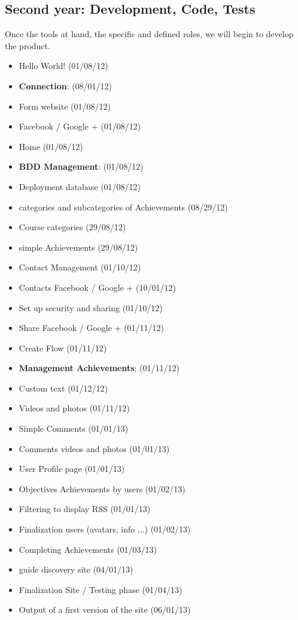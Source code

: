 \documentclass {life-en}
\begin{document}
\subsection{Second year: Development, Code, Tests}
Once the tools at hand, the specific and defined roles, we will begin to develop the product.\\
\begin{itemize}
  \item Hello World! (01/08/12)
  \item \textbf{Connection}: (08/01/12)
  \item Form website (01/08/12)
  \item Facebook / Google + (01/08/12)
  \item Home (01/08/12)
  \item \textbf{BDD Management}: (01/08/12)
  \item Deployment database (01/08/12)
  \item categories and subcategories of Achievements (08/29/12)
  \item Course categories (29/08/12)
  \item simple Achievements (29/08/12)
  \item Contact Management (01/10/12)
  \item Contacts Facebook / Google + (10/01/12)
  \item Set up security and sharing (01/10/12)
  \item Share Facebook / Google + (01/11/12)
  \item Create Flow (01/11/12)
  \item \textbf{Management Achievements}: (01/11/12)
  \item Custom text (01/12/12)
  \item Videos and photos (01/11/12)
  \item Simple Comments (01/01/13)
  \item Comments videos and photos (01/01/13)
  \item User Profile page (01/01/13)
  \item Objectives Achievements by users (01/02/13)
  \item Filtering to display RSS (01/01/13)
  \item Finalization users (avatars, info ...) (01/02/13)
  \item Completing Achievements (01/03/13)
  \item guide discovery site (04/01/13)
  \item Finalization Site / Testing phase (01/04/13)
  \item Output of a first version of the site (06/01/13)
\end{itemize}
\end{document}
